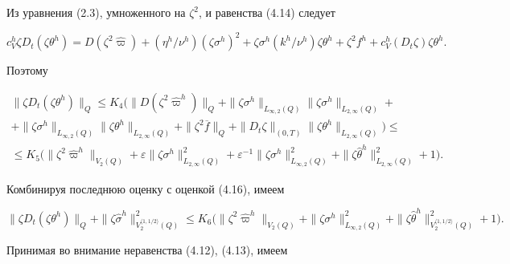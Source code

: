\begin{pf}
\begin{equation}
\end{equation}





Из уравнения (2.3), умноженного на $\zeta^2$, и равенства (4.14) следует


$$


c_V^h\zeta D_t(\zeta\theta^h)=D(\zeta^2\widehat\varpi)+


(\eta^h/\nu^h)(\zeta\sigma^h)^2+\zeta\sigma^h(k^h/\nu^h)\zeta\theta^h


+\zeta^2f^h+c_V^h(D_t\zeta)\zeta\theta^h.


$$


Поэтому


\begin{multline*}


\|\zeta D_t(\zeta\theta^h)\|_Q\le K_4(\|D(\zeta^2\widehat\varpi^h)\|_Q+


\|\zeta\sigma^h\|_{L_{\infty,2}(Q)}\|\zeta\sigma^h\|_{L_{2,\infty}(Q)}+\\


+\|\zeta\sigma^h\|_{L_{\infty,2}(Q)}\|\zeta\theta^h\|_{L_{2,\infty}(Q)}


+\|\zeta^2\overline f\|_Q


+\|D_t\zeta\|_{(0,T)}\|\zeta\theta^h\|_{L_{2,\infty}(Q)})\le\\


\le K_5\big(\|\zeta^2\widehat\varpi^h\|_{V_2(Q)}+


\varepsilon\|\zeta\sigma^h\|^2_{L_{2,\infty}(Q)}+


\varepsilon^{-1}\|\zeta\sigma^h\|^2_{L_{\infty,2}(Q)}


+\|\zeta\widehat\theta^h\|^2_{L_{2,\infty}(Q)}+1\big).


\end{multline*}


Комбинируя последнюю оценку с оценкой (4.16), имеем


$$


\|\zeta D_t(\zeta\theta^h)\|_Q+


\|\zeta\widehat\sigma^h\|^2_{V_2^{\langle 1,1/2\rangle}(Q)}\le


K_6\big(\|\zeta^2\widehat\varpi^h\|_{V_2(Q)}+


\|\zeta\sigma^h\|^2_{L_{\infty,2}(Q)}


+\|\zeta\widehat\theta^h\|^2_{V_2^{\langle 1,1/2\rangle}(Q)}+1\big).


$$


Принимая во внимание неравенства (4.12), (4.13), имеем



\end{pf}
